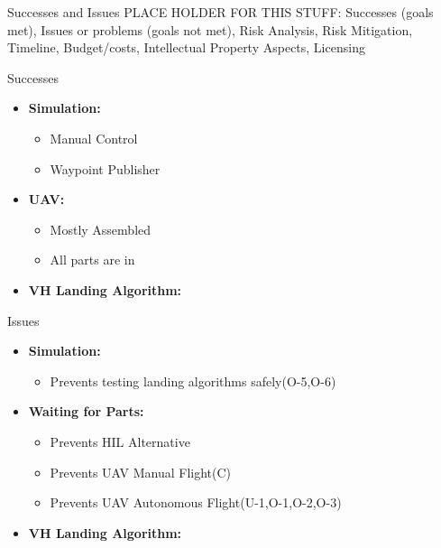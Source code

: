 \documentclass[11pt]{beamer}
\begin{document}


\begin{frame}{Successes and Issues}
PLACE HOLDER FOR THIS STUFF:
Successes (goals met), Issues or problems (goals not met), Risk Analysis, Risk Mitigation, Timeline,
Budget/costs, Intellectual Property Aspects, Licensing
\end{frame}

\begin{frame}{Successes}
\begin{itemize}
\item \textbf{Simulation:}\\
\begin{itemize}
\item Manual Control
\item Waypoint Publisher
\end{itemize}
\item \textbf{UAV:}\\
\begin{itemize}
\item Mostly Assembled
\item All parts are in
\end{itemize}
\item \textbf{VH Landing Algorithm:}\\
\end{itemize}
\end{frame}

\begin{frame}{Issues}

\begin{itemize}
\item \textbf{Simulation:}\\
\begin{itemize}
\item Prevents testing landing algorithms safely(O-5,O-6)
\end{itemize}
\item \textbf{Waiting for Parts:}\\
\begin{itemize}
\item Prevents HIL Alternative
\item Prevents UAV Manual Flight(C)
\item Prevents UAV Autonomous Flight(U-1,O-1,O-2,O-3)
\end{itemize}
\item \textbf{VH Landing Algorithm:}\\
\end{itemize}

\end{frame}
\end{document}
